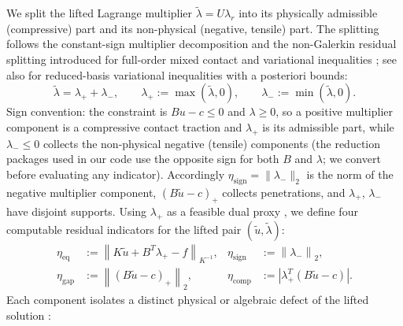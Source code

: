 \documentclass[11pt,a4paper]{article}
\begin{document}
We split the lifted Lagrange multiplier \(\tilde{\lambda} = U \lambda_r\) into its physically admissible (compressive) part and its non-physical (negative, tensile) part. The splitting follows the constant-sign multiplier decomposition and the non-Galerkin residual splitting introduced for full-order mixed contact and variational inequalities \cite{hild2007residual, dabaghi2020posteriori, banz2024generic, banz2026posteriori}; see also \cite{haasdonk2012reduced} for reduced-basis variational inequalities with a posteriori bounds:
\begin{equation}\label{eq:split}
\tilde{\lambda} = \lambda_+ + \lambda_-, \qquad \lambda_+ := \max(\tilde{\lambda}, 0), \qquad \lambda_- := \min(\tilde{\lambda}, 0).
\end{equation}
Sign convention: the constraint is \(B u - c \le 0\) and \(\lambda \ge 0\), so a positive multiplier component is a compressive contact traction and \(\lambda_+\) is its admissible part, while \(\lambda_- \le 0\) collects the non-physical negative (tensile) components (the reduction packages used in our code use the opposite sign for both \(B\) and \(\lambda\); we convert before evaluating any indicator). Accordingly \(\eta_{\mathrm{sign}} = \|\lambda_-\|_2\) is the norm of the negative multiplier component, \((B\tilde{u} - c)_+\) collects penetrations, and \(\lambda_+\), \(\lambda_-\) have disjoint supports. Using \(\lambda_+\) as a feasible dual proxy \cite{hild2007residual, fontana2024guaranteed}, we define four computable residual indicators for the lifted pair \((\tilde{u}, \tilde{\lambda})\):
\begin{equation}\label{eq:indicators}
\begin{aligned}
\eta_{\mathrm{eq}} &:= \left\| K \tilde{u} + B^T \lambda_+ - f \right\|_{K^{-1}}, & \eta_{\mathrm{sign}} &:= \left\| \lambda_- \right\|_2, \\
\eta_{\mathrm{gap}} &:= \left\| (B \tilde{u} - c)_+ \right\|_2, & \eta_{\mathrm{comp}} &:= \left| \lambda_+^T (B \tilde{u} - c) \right|.
\end{aligned}
\end{equation}
Each component isolates a distinct physical or algebraic defect of the lifted solution \cite{dabaghi2020posteriori, banz2024generic, fontana2024guaranteed}:
\end{document}
